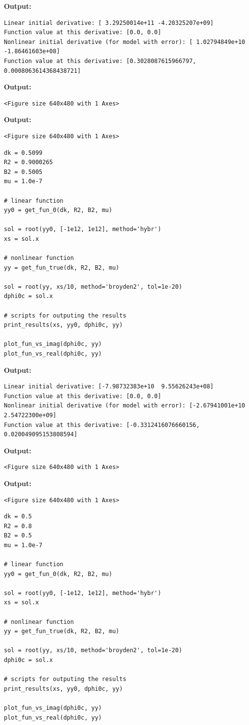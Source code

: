 \documentclass{article}
\begin{document}
\textbf{Output:}\begin{verbatim}
Linear initial derivative: [ 3.29250014e+11 -4.20325207e+09]
Function value at this derivative: [0.0, 0.0]
Nonlinear initial derivative (for model with error): [ 1.02794849e+10 -1.86461603e+08]
Function value at this derivative: [0.3028087615966797, 0.0008063614368438721]

\end{verbatim}

\textbf{Output:}\begin{verbatim}
<Figure size 640x480 with 1 Axes>
\end{verbatim}

\textbf{Output:}\begin{verbatim}
<Figure size 640x480 with 1 Axes>
\end{verbatim}

\begin{lstlisting}
dk = 0.5099
R2 = 0.9000265
B2 = 0.5005
mu = 1.0e-7

# linear function
yy0 = get_fun_0(dk, R2, B2, mu)

sol = root(yy0, [-1e12, 1e12], method='hybr')
xs = sol.x

# nonlinear function
yy = get_fun_true(dk, R2, B2, mu)

sol = root(yy, xs/10, method='broyden2', tol=1e-20)
dphi0c = sol.x

# scripts for outputing the results
print_results(xs, yy0, dphi0c, yy)

plot_fun_vs_imag(dphi0c, yy)
plot_fun_vs_real(dphi0c, yy)\end{lstlisting}

\textbf{Output:}\begin{verbatim}
Linear initial derivative: [-7.98732383e+10  9.55626243e+08]
Function value at this derivative: [0.0, 0.0]
Nonlinear initial derivative (for model with error): [-2.67941001e+10  2.54722300e+09]
Function value at this derivative: [-0.3312416076660156, 0.020049095153808594]

\end{verbatim}

\textbf{Output:}\begin{verbatim}
<Figure size 640x480 with 1 Axes>
\end{verbatim}

\textbf{Output:}\begin{verbatim}
<Figure size 640x480 with 1 Axes>
\end{verbatim}

\begin{lstlisting}
dk = 0.5
R2 = 0.8
B2 = 0.5
mu = 1.0e-7

# linear function
yy0 = get_fun_0(dk, R2, B2, mu)

sol = root(yy0, [-1e12, 1e12], method='hybr')
xs = sol.x

# nonlinear function
yy = get_fun_true(dk, R2, B2, mu)

sol = root(yy, xs/10, method='broyden2', tol=1e-20)
dphi0c = sol.x

# scripts for outputing the results
print_results(xs, yy0, dphi0c, yy)

plot_fun_vs_imag(dphi0c, yy)
plot_fun_vs_real(dphi0c, yy)\end{lstlisting}
\end{document}
